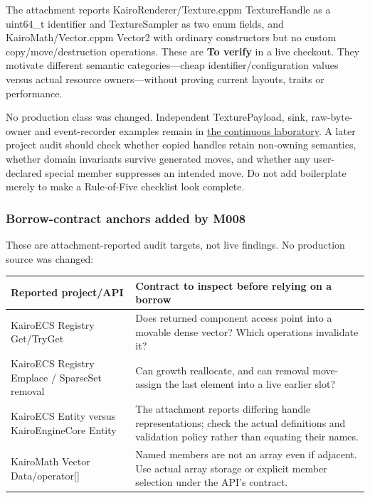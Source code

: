 \hypertarget{appendix-4e2236f53445-value-transfer-anchors-added-by-m009}{}

The attachment reports KairoRenderer/Texture.cppm TextureHandle as a uint64\_t identifier and TextureSampler as two enum fields, and KairoMath/Vector.cppm Vector2 with ordinary constructors but no custom copy/move/destruction operations. These are \textbf{To verify} in a live checkout. They motivate different semantic categories---cheap identifier/configuration values versus actual resource owners---without proving current layouts, traits or performance.

No production class was changed. Independent TexturePayload, sink, raw-byte-owner and event-recorder examples remain in \hyperref[01-foundations-i-ch004-complete-runnable-value-transfer-laboratory]{the continuous laboratory}. A later project audit should check whether copied handles retain non-owning semantics, whether domain invariants survive generated moves, and whether any user-declared special member suppresses an intended move. Do not add boilerplate merely to make a Rule-of-Five checklist look complete.

\subsubsection{Borrow-contract anchors added by M008}\label{appendix-4e2236f53445-borrow-contract-anchors-added-by-m008}

\hypertarget{appendix-4e2236f53445-borrow-contract-anchors-added-by-m008}{}

These are attachment-reported audit targets, not live findings. No production source was changed:

{\def\LTcaptype{none} %
\begin{longtable}[]{@{}
  >{\raggedright\arraybackslash}p{}
  >{\raggedright\arraybackslash}p{}@{}}
\toprule\noalign{}
\begin{minipage}[b]{\linewidth}\raggedright
Reported project/API
\end{minipage} & \begin{minipage}[b]{\linewidth}\raggedright
Contract to inspect before relying on a borrow
\end{minipage} \\
\midrule\noalign{}
\endhead
\bottomrule\noalign{}
\endlastfoot
KairoECS Registry Get/TryGet & Does returned component access point into a movable dense vector? Which operations invalidate it? \\
KairoECS Registry Emplace / SparseSet removal & Can growth reallocate, and can removal move-assign the last element into a live earlier slot? \\
KairoECS Entity versus KairoEngineCore Entity & The attachment reports differing handle representations; check the actual definitions and validation policy rather than equating their names. \\
KairoMath Vector Data/operator{[}{]} & Named members are not an array even if adjacent. Use actual array storage or explicit member selection under the API's contract. \\
\end{longtable}
}

